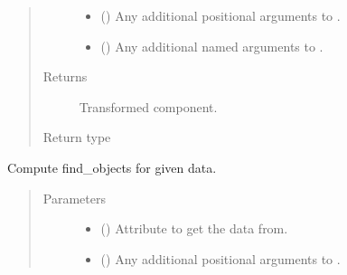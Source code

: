 \documentclass[letterpaper,10pt,english]{sphinxmanual}
\begin{document}
\begin{fulllineitems}
\begin{fulllineitems}
\begin{quote}
\begin{description}
\begin{itemize}
\item {} 
 () \textendash{} Any additional positional arguments to .

\item {} 
 () \textendash{} Any additional named arguments to .

\end{itemize}

\item[{Returns}] \leavevmode
{} \textendash{} Transformed component.

\item[{Return type}] \leavevmode
{\hyperref[\detokenize{api/base_classes:geology.src.base_spatial.SpatialComponent}]{}}

\end{description}\end{quote}

\end{fulllineitems}


\begin{fulllineitems}
\label{\detokenize{api/states:geology.src.States.find_objects}}
Compute find\_objects for given data.
\begin{quote}\begin{description}
\item[{Parameters}] \leavevmode\begin{itemize}
\item {} 
 (\sphinxstyleliteralemphasis{\sphinxupquote{, }}) \textendash{} Attribute to get the data from.

\item {} 
 () \textendash{} Any additional positional arguments to .


\end{itemize}
\end{description}
\end{quote}
\end{fulllineitems}
\end{fulllineitems}
\end{document}
